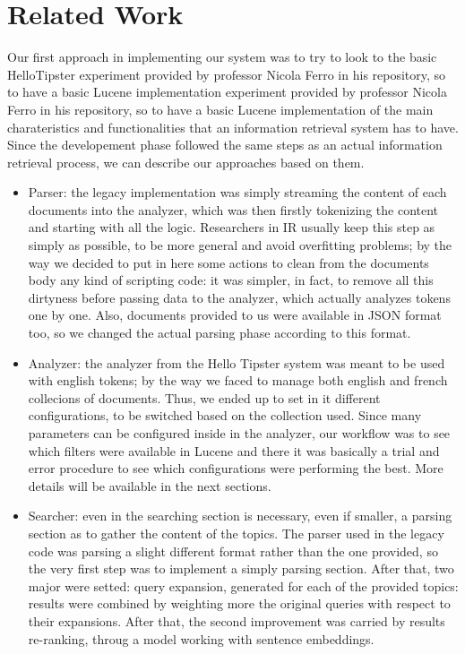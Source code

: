 \section{Related Work}
\label{sec:related}

Our first approach in implementing our system was to try to look to the basic HelloTipster 
experiment provided by professor Nicola Ferro in his repository, so to have a basic Lucene implementation
experiment provided by professor Nicola Ferro in his repository, so to have a basic Lucene implementation
of the main charateristics and functionalities that an information retrieval system has to have.
Since the developement phase followed the same steps as an actual information retrieval process,
we can describe our approaches based on them.

\begin{itemize}
    \item Parser: the legacy implementation was simply streaming the content of each documents into the analyzer, which was then firstly tokenizing the content and starting with all the logic. Researchers in IR usually keep this step as simply as possible, to be more general and avoid overfitting problems; by the way we decided to put in here some actions to clean from the documents body any kind of scripting code: it was simpler, in fact, to remove all this dirtyness before passing data to the analyzer, which actually analyzes tokens one by one. Also, documents provided to us were available in JSON format too, so we changed the actual parsing phase according to this format.
    \item Analyzer: the analyzer from the Hello Tipster system was meant to be used with english tokens; by the way we faced to manage both english and french collecions of documents. Thus, we ended up to set in it different configurations, to be switched based on the collection used. Since many parameters can be configured inside in the analyzer, our workflow was to see which filters were available in Lucene and there it was basically a trial and error procedure to see which configurations were performing the best. More details will be available in the next sections.
    \item Searcher: even in the searching section is necessary, even if smaller, a parsing section as to gather the content of the topics. The parser used in the legacy code was parsing a slight different format rather than the one provided, so the very first step was to implement a simply parsing section. After that, two major were setted: query expansion, generated for each of the provided topics: results were combined by weighting more the original queries with respect to their expansions. After that, the second improvement was carried by results re-ranking, throug a model working with sentence embeddings.
\end{itemize}

